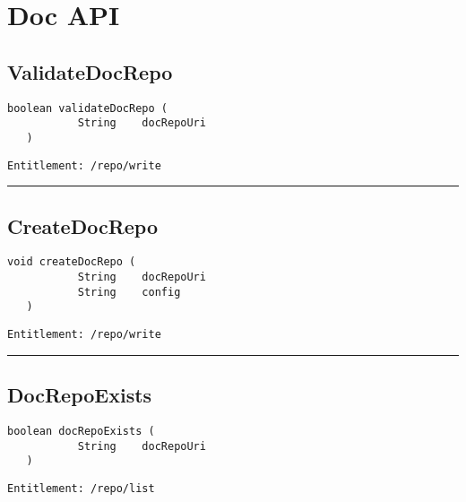 \chapter{Doc API}

\section{ValidateDocRepo}
\label{Api:ValidateDocRepo}
\begin{lstlisting}[style=nonumbers]
   boolean validateDocRepo (
           String    docRepoUri
   )
\end{lstlisting}
\begin{Verbatim}[formatcom=\color{Maroon}]
  Entitlement: /repo/write
\end{Verbatim}



\rule{12cm}{2pt}
\section{CreateDocRepo}
\label{Api:CreateDocRepo}
\begin{lstlisting}[style=nonumbers]
   void createDocRepo (
           String    docRepoUri
           String    config
   )
\end{lstlisting}
\begin{Verbatim}[formatcom=\color{Maroon}]
  Entitlement: /repo/write
\end{Verbatim}



\rule{12cm}{2pt}
\section{DocRepoExists}
\label{Api:DocRepoExists}
\begin{lstlisting}[style=nonumbers]
   boolean docRepoExists (
           String    docRepoUri
   )
\end{lstlisting}
\begin{Verbatim}[formatcom=\color{Maroon}]
  Entitlement: /repo/list
\end{Verbatim}



